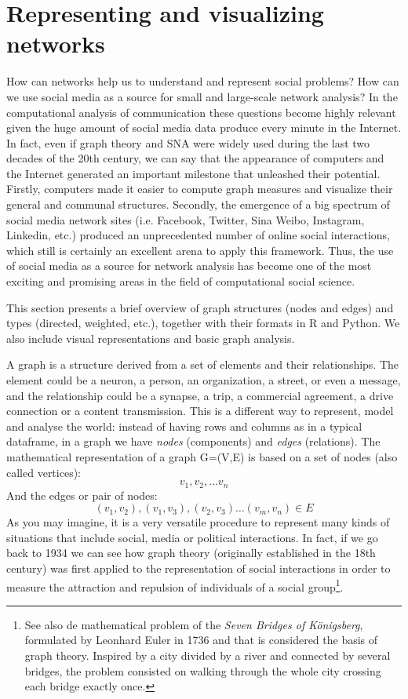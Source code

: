 \section{Representing and visualizing networks}
\label{sec:graph}

How can networks help us to understand and represent social problems? How can we use social media as a source for small and large-scale network analysis? In the computational analysis of communication these questions become highly relevant given the huge amount of social media data produce every minute in the Internet. In fact, even if graph theory and SNA were widely used during the last two decades of the 20th century, we can say that the appearance of computers and the Internet generated an important milestone that unleashed their potential. Firstly, computers made it easier to compute graph measures and visualize their general and communal structures. Secondly, the emergence of a big spectrum of social media network sites (i.e. Facebook, Twitter, Sina Weibo, Instagram, Linkedin, etc.) produced an unprecedented number of online social interactions, which still is certainly an excellent arena to apply this framework. Thus, the use of social media as a source for network analysis has become one of the most exciting and promising areas in the field of computational social science.

This section presents a brief overview of graph structures (nodes and edges) and types (directed, weighted, etc.), together with their formats in R and Python. We also include visual representations and basic graph analysis.  
 
A graph is a structure derived from a set of elements and their relationships. The element could be a neuron, a person, an organization, a street, or even a message, and the relationship could be a synapse, a trip, a commercial agreement, a drive connection or a content transmission. This is a different way to represent, model and analyse the world: instead of having rows and columns as in a typical dataframe, in a graph we have \textit{nodes} (components) and \textit{edges} (relations). The mathematical representation of a graph G=(V,E) is based on a set of nodes (also called vertices): \[{v_{1}, v_{2},… v_{n}}\] And the edges or pair of nodes: \[{(v_{1}, v_{2}), (v_{1}, v_{3}), (v_{2},v_{3}) … (v_{m}, v_{n}) \in E}\] As you may imagine, it is a very versatile procedure to represent many kinds of situations that include social, media or political interactions. In fact, if we go back to 1934 we can see how graph theory (originally established in the 18th century) was first applied to the representation of social interactions \citep{moreno1934shall} in order to measure the attraction and repulsion of individuals of a social group\footnote{See also de mathematical problem of the \textit{Seven Bridges of Königsberg}, formulated by Leonhard Euler in 1736 and that is considered the basis of graph theory. Inspired by a city divided by a river and connected by several bridges, the problem consisted on walking through the whole city crossing each bridge exactly once.}.

